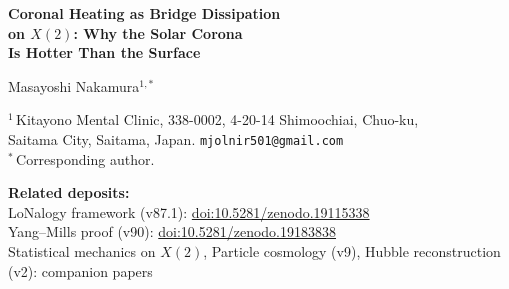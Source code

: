 \documentclass[12pt]{article}
\theoremstyle{plain}
\theoremstyle{definition}
\numberwithin{equation}{section}
\newcommand{\br}{\mathrm{br}}
\DeclareMathOperator{\sech}{sech}
\begin{document}
\begin{titlepage}
\centering
\vspace*{1cm}

{\LARGE\bfseries Coronal Heating as Bridge Dissipation\\[6pt]
on $X(2)$: Why the Solar Corona\\[6pt]
Is Hotter Than the Surface}

\vspace{1.5cm}

{\large Masayoshi Nakamura$^{1,*}$}

\vspace{0.8cm}

{\normalsize
$^1$\,Kitayono Mental Clinic,
338-0002, 4-20-14 Shimoochiai, Chuo-ku,\\
Saitama City, Saitama, Japan.
\texttt{mjolnir501@gmail.com}\\[4pt]
$^*$\,Corresponding author.
}

\vspace{0.8cm}

{\small
\noindent\textbf{Related deposits:}\\
LoNalogy framework (v87.1):
\href{https://doi.org/10.5281/zenodo.19115338}{doi:10.5281/zenodo.19115338}\\
Yang--Mills proof (v90):
\href{https://doi.org/10.5281/zenodo.19183838}{doi:10.5281/zenodo.19183838}\\
Statistical mechanics on $X(2)$, Particle cosmology (v9),
Hubble reconstruction (v2): companion papers
}

\vspace{1.0cm}

\begin{abstract}
\noindent
The solar coronal heating problem---why the corona at
$T\sim10^6\,\mathrm{K}$ is two orders of magnitude hotter than
the photosphere at $T\sim6\times10^3\,\mathrm{K}$---has resisted
a definitive resolution for over 70~years.  We show that within
the LoNalogy framework, the temperature inversion is a one-line
theorem:  the per-particle heating
$q_{\br}(s)=Q_{\br}(s)/n(s)$ is monotonically increasing toward
the bridge peak because the $\sech^2$ bridge dissipation profile
is divided by an exponentially decreasing density.
Concretely, the bridge heating density
$Q_{\br}(s)=Q_0\,\sech^2\!\bigl((s-s_B)/\ell_B\bigr)$ and the
hydrostatic density $n(s)=n_0\,e^{-s/H}$ yield
$d(\log q_{\br})/ds>0$ for $s<s_B$.  A steady-state energy
balance then forces a coronal temperature maximum above the
photosphere.
The 70-year debate between wave heating and nanoflare/reconnection
heating is resolved by showing that both are basis decompositions
of the same positive bridge quadratic form
$Q_0=\eta\langle J,\Delta_{\br}J\rangle$.
\end{abstract}
\end{titlepage}
\end{document}

